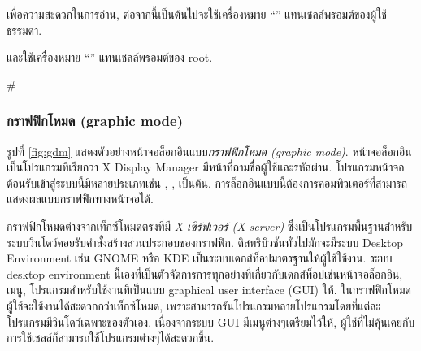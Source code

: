 \begin{thwbr}
เพื่อความสะดวกในการอ่าน, ต่อจากนี้เป็นต้นไปจะใช้เครื่องหมาย ``'' แทนเชลล์พรอมต์ของผู้ใช้ธรรมดา. 
\begin{MyExample}
\begin{MyEx}
$ \cursorprompt
\end{MyEx}
\end{MyExample}
และใช้เครื่องหมาย ``\cmd{\#}'' แทนเชลล์พรอมต์ของ root.
\begin{MyExample}
\begin{MyEx}
# \cursorprompt
\end{MyEx}
\end{MyExample}%



\subsubsection{กราฟฟิกโหมด (graphic mode)}%
%
รูปที่ \ref{fig:gdm} แสดงตัวอย่างหน้าจอล็อกอินแบบ\emph{กราฟฟิกโหมด (graphic mode)}. หน้าจอล็อกอินเป็นโปรแกรมที่เรียกว่า X Display Manager %
มีหน้าที่ถามชื่อผู้ใช้และรหัสผ่าน. โปรแกรมหน้าจอต้อนรับเข้าสู่ระบบนี้มีหลายประเภทเช่น , ,  เป็นต้น. %
การล็อกอินแบบนี้ต้องการคอมพิวเตอร์ที่สามารถแสดงผลแบบกราฟฟิกทางหน้าจอได้.

\begin{figure}[!tb]
\end{figure}


กราฟฟิกโหมดต่างจากเท็กซ์โหมดตรงที่มี \emph{X เซิร์ฟเวอร์ (X server)} %
ซึ่งเป็นโปรแกรมพื้นฐานสำหรับระบบวินโดว์คอยรับคำสั่งสร้างส่วนประกอบของกราฟฟิก. ดิสทริบิวชันทั่วไปมักจะมีระบบ Desktop Environment %
เช่น GNOME หรือ KDE เป็นระบบเดกส์ท็อปมาตรฐานให้ผู้ใช้ใช้งาน. ระบบ desktop environment %
นี้เองที่เป็นตัวจัดการการทุกอย่างที่เกี่ยวกับเดกส์ท็อปเช่นหน้าจอล็อกอิน, เมนู, โปรแกรมสำหรับใช้งานที่เป็นแบบ graphical user interface (GUI) %
%
ให้. ในกราฟฟิกโหมดผู้ใช้จะใช้งานได้สะดวกกว่าเท็กซ์โหมด, เพราะสามารถรันโปรแกรมหลายโปรแกรมโดยที่แต่ละโปรแกรมมีวินโดว์เฉพาะของตัวเอง. เนื่องจากระบบ GUI มีเมนูต่างๆเตรียมไว้ให้, ผู้ใช้ที่ไม่คุ้นเคยกับการใช้เชลล์ก็สามารถใช้โปรแกรมต่างๆได้สะดวกขึ้น.


\end{thwbr}

